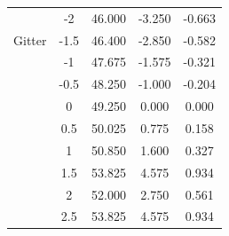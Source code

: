 \documentclass[12pt,a4paper,titlepage,headinclude,bibtotoc]{scrartcl}
\begin{document}
\begin{table}[!htb]
\begin{tabular}{|c||c|c|c|c|}
		&	-2	&	46.000	&	-3.250	&	-0.663	\\
		Gitter &	-1.5	&	46.400	&	-2.850	&	-0.582	\\
		&	-1	&	47.675	&	-1.575	&	-0.321	\\
		&	-0.5	&	48.250	&	-1.000	&	-0.204	\\
		&	0	&	49.250	&	0.000	&	0.000	\\
		&	0.5	&	50.025	&	0.775	&	0.158	\\
		&	1	&	50.850	&	1.600	&	0.327	\\
		&	1.5	&	53.825	&	4.575	&	0.934	\\
		&	2	&	52.000	&	2.750	&	0.561	\\
		&	2.5	&	53.825	&	4.575	&	0.934	\\
		\hline
	\end{tabular}
\end{table}



\end{document}
